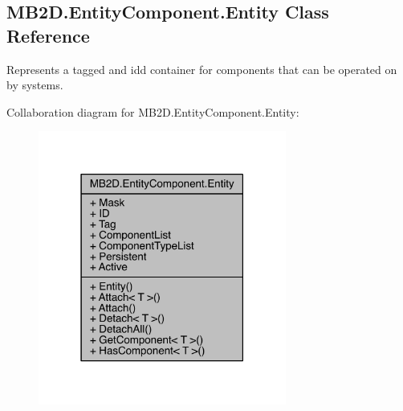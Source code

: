 \hypertarget{class_m_b2_d_1_1_entity_component_1_1_entity}{}\subsection{M\+B2\+D.\+Entity\+Component.\+Entity Class Reference}
\label{class_m_b2_d_1_1_entity_component_1_1_entity}


Represents a tagged and id\textquotesingle{}d container for components that can be operated on by systems.  




Collaboration diagram for M\+B2\+D.\+Entity\+Component.\+Entity\+:
\nopagebreak
\begin{figure}[H]
\begin{center}
\leavevmode
\includegraphics[width=231pt]{class_m_b2_d_1_1_entity_component_1_1_entity__coll__graph}
\end{center}
\end{figure}
